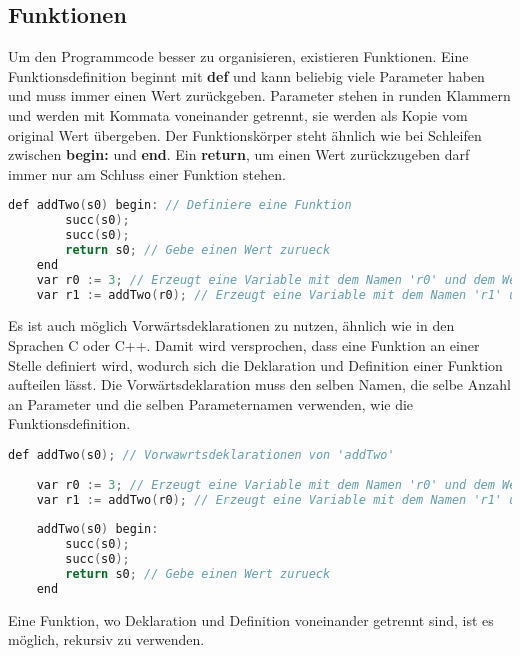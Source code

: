 \subsection{Funktionen}
Um den Programmcode besser zu organisieren, existieren Funktionen. Eine Funktionsdefinition beginnt mit \textbf{def} und kann beliebig viele Parameter haben und muss immer einen Wert zurückgeben. Parameter stehen in runden Klammern und werden mit Kommata voneinander getrennt, sie werden als Kopie vom original Wert übergeben. Der Funktionskörper steht ähnlich wie bei Schleifen zwischen \textbf{begin:} und \textbf{end}. Ein \textbf{return}, um einen Wert zurückzugeben darf immer nur am Schluss einer Funktion stehen.

\begin{lstlisting}[language=c, caption=Funktionen in While, label={lst:while-function}]
	def addTwo(s0) begin: // Definiere eine Funktion
		succ(s0);
		succ(s0);
		return s0; // Gebe einen Wert zurueck
	end
	var r0 := 3; // Erzeugt eine Variable mit dem Namen 'r0' und dem Wert 3
	var r1 := addTwo(r0); // Erzeugt eine Variable mit dem Namen 'r1' und dem Wert von addTwo(r0)
\end{lstlisting}

Es ist auch möglich Vorwärtsdeklarationen zu nutzen, ähnlich wie in den Sprachen C oder C++. Damit wird versprochen, dass eine Funktion an einer Stelle definiert wird, wodurch sich die Deklaration und Definition einer Funktion aufteilen lässt. Die Vorwärtsdeklaration muss den selben Namen, die selbe Anzahl an Parameter und die selben Parameternamen verwenden, wie die Funktionsdefinition.

\begin{lstlisting}[language=c, caption=Vorwärtsdekleration in While, label={lst:while-decfunction}]
	def addTwo(s0); // Vorwawrtsdeklarationen von 'addTwo'
	
	var r0 := 3; // Erzeugt eine Variable mit dem Namen 'r0' und dem Wert 3
	var r1 := addTwo(r0); // Erzeugt eine Variable mit dem Namen 'r1' und dem Wert von addTwo(r0)
	
	addTwo(s0) begin:
		succ(s0);
		succ(s0);
		return s0; // Gebe einen Wert zurueck
	end

\end{lstlisting}

Eine Funktion, wo Deklaration und Definition voneinander getrennt sind, ist es möglich, rekursiv zu verwenden.